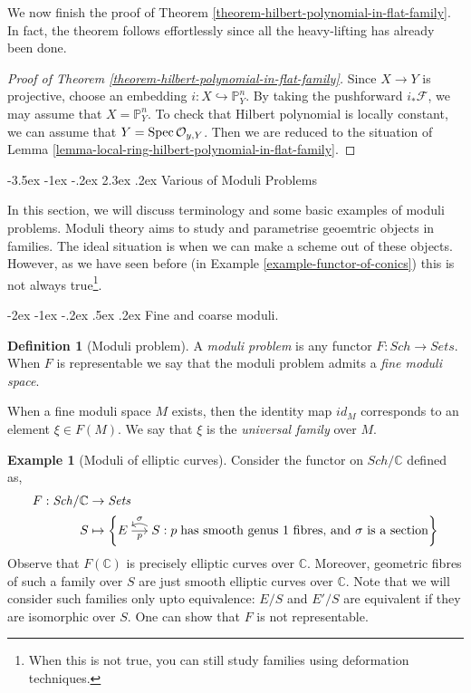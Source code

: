 \documentclass[11pt]{amsart}
\makeatletter
\renewcommand\section{\@startsection {section}{1}{\z@}%
	{-3.5ex \@plus -1ex \@minus -.2ex}%
	{2.3ex \@plus.2ex}%
	{\normalfont\scshape\center}}
\renewcommand\subsection{\@startsection {subsection}{1}{\z@}%
	{-2ex \@plus -1ex \@minus -.2ex}%
	{.5ex \@plus.2ex}%
	{\normalfont\bfseries}}
\newcommand{\Spec}{{\rm Spec \,}}
\newcommand{\sF}{{\mathcal F}}
\newcommand{\sO}{{\mathcal O}}
\newcommand{\C}{{\mathbb C}}
\renewcommand{\P}{{\mathbb P}}
\theoremstyle{definition}
\newtheorem{definition}[theorem]{Definition}
\newtheorem{example}[theorem]{Example}
\makeatother
\begin{document}
We now finish the proof of Theorem \ref{theorem-hilbert-polynomial-in-flat-family}. In fact, the theorem follows effortlessly since all the heavy-lifting has already  been done.

\begin{proof}[Proof of Theorem \ref{theorem-hilbert-polynomial-in-flat-family}]
	Since $X\rightarrow Y$ is projective, choose an embedding $i:X\hookrightarrow \P_Y^n$. By taking the pushforward $i_*\sF$, we may assume that $X=\P_Y^n$. To check that Hilbert polynomial is locally constant, we can assume that $Y=\Spec \sO_{y,Y}$. Then we are reduced to the situation of Lemma \ref{lemma-local-ring-hilbert-polynomial-in-flat-family}.
\end{proof}


\section{Various of Moduli Problems}

In this section, we will discuss terminology and some basic examples of moduli problems. Moduli theory aims to study and parametrise geoemtric objects in families. The ideal situation is when we can make a scheme out of these objects. However, as we have seen before (in Example \ref{example-functor-of-conics}) this is not always true\footnote{When this is not true, you can still study families using deformation techniques.}.

\subsection{Fine and coarse moduli.}
\begin{definition}[Moduli problem]
	A \textit{moduli problem} is any functor $F: \mathit{Sch} \rightarrow \mathit{Sets}$. When $F$ is representable we say that the moduli problem admits a \textit{fine moduli space}.
\end{definition}

When a fine moduli space $M$ exists, then the identity map $id_M$ corresponds to an element $\xi \in F(M)$. We say that $\xi$ is the \textit{universal family} over $M$.

\begin{example}[Moduli of elliptic curves]
	Consider the functor on $\mathit{Sch}/\C$ defined as,
	\begin{align*}
	F: \mathit{Sch/\C} &\rightarrow \mathit{Sets}\\
	S & \mapsto \left\{
	\begin{tikzcd}[cramped, column sep=3ex, ampersand replacement=\&]
	E\arrow[r, "p"'] \& S\arrow[l, bend right, "\sigma"']
	\end{tikzcd}
	 : p \;\text{has smooth genus 1 fibres, and $\sigma$ is a section}
	\right\}
	\end{align*}
	Observe that $F(\C)$ is precisely elliptic curves over $\C$. Moreover, geometric fibres of such a family over $S$ are just smooth elliptic curves over $\C$. Note that we will consider such families only upto equivalence: $E/S$ and $E'/S$ are equivalent if they are isomorphic over $S$. One can show that $F$ is not representable.
\end{example}
\end{document}
